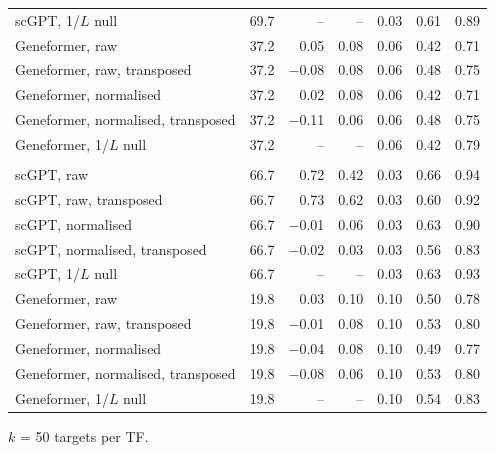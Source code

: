 \begin{table}[htbp]
\begin{tabular}{@{}lrrrrrr@{}}
scGPT, 1/$L$ null & 69.7 & -- & -- & 0.03 & 0.61 & 0.89 \\
Geneformer, raw & 37.2 & 0.05 & 0.08 & 0.06 & 0.42 & 0.71 \\
Geneformer, raw, transposed & 37.2 & $-$0.08 & 0.08 & 0.06 & 0.48 & 0.75 \\
Geneformer, normalised & 37.2 & 0.02 & 0.08 & 0.06 & 0.42 & 0.71 \\
Geneformer, normalised, transposed & 37.2 & $-$0.11 & 0.06 & 0.06 & 0.48 & 0.75 \\
Geneformer, 1/$L$ null & 37.2 & -- & -- & 0.06 & 0.42 & 0.79 \\
\addlinespace[3pt]
\multicolumn{7}{@{}l}{\emph{Lung}} \\
scGPT, raw & 66.7 & 0.72 & 0.42 & 0.03 & 0.66 & 0.94 \\
scGPT, raw, transposed & 66.7 & 0.73 & 0.62 & 0.03 & 0.60 & 0.92 \\
scGPT, normalised & 66.7 & $-$0.01 & 0.06 & 0.03 & 0.63 & 0.90 \\
scGPT, normalised, transposed & 66.7 & $-$0.02 & 0.03 & 0.03 & 0.56 & 0.83 \\
scGPT, 1/$L$ null & 66.7 & -- & -- & 0.03 & 0.63 & 0.93 \\
Geneformer, raw & 19.8 & 0.03 & 0.10 & 0.10 & 0.50 & 0.78 \\
Geneformer, raw, transposed & 19.8 & $-$0.01 & 0.08 & 0.10 & 0.53 & 0.80 \\
Geneformer, normalised & 19.8 & $-$0.04 & 0.08 & 0.10 & 0.49 & 0.77 \\
Geneformer, normalised, transposed & 19.8 & $-$0.08 & 0.06 & 0.10 & 0.53 & 0.80 \\
Geneformer, 1/$L$ null & 19.8 & -- & -- & 0.10 & 0.54 & 0.83 \\
\bottomrule
\end{tabular}
\par\smallskip
\begin{minipage}{\linewidth}\footnotesize
$k$ = 50 targets per TF.
\end{minipage}
\end{table}
